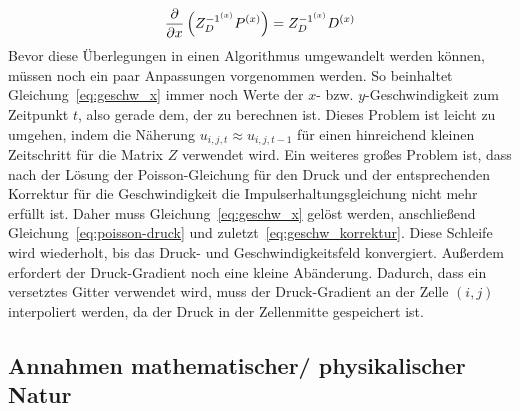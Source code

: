 \begin{align*}
    \frac{\partial }{\partial x}\left( Z_D^{-1^{(x)}} P^{(x)} \right) = Z_D^{-1^{(x)}} D^{(x)}
\end{align*}
Bevor diese Überlegungen in einen Algorithmus umgewandelt werden können, müssen noch ein paar Anpassungen vorgenommen werden. So beinhaltet Gleichung~\eqref{eq:geschw_x} immer noch Werte der $x$- bzw. $y$-Geschwindigkeit zum Zeitpunkt $t$, also gerade dem, der zu berechnen ist. Dieses Problem ist leicht zu umgehen, indem die Näherung $u_{i,j,t} \approx u_{i,j,t-1}$ für einen hinreichend kleinen Zeitschritt für die Matrix $Z$ verwendet wird. Ein weiteres großes Problem ist, dass nach der Lösung der Poisson-Gleichung für den Druck und der entsprechenden Korrektur für die Geschwindigkeit die Impulserhaltungsgleichung nicht mehr erfüllt ist. Daher muss Gleichung~\eqref{eq:geschw_x} gelöst werden, anschließend Gleichung~\eqref{eq:poisson-druck} und zuletzt~\eqref{eq:geschw_korrektur}. Diese Schleife wird wiederholt, bis das Druck- und Geschwindigkeitsfeld konvergiert. Außerdem erfordert der Druck-Gradient noch eine kleine Abänderung. Dadurch, dass ein versetztes Gitter verwendet wird, muss der Druck-Gradient an der Zelle $(i,j)$ interpoliert werden, da der Druck in der Zellenmitte gespeichert ist.

\subsection{Annahmen mathematischer/ physikalischer Natur}